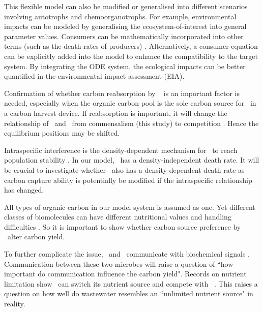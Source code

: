 \documentclass[../thesis.tex]{subfiles} %
\begin{document}
This flexible model can also be modified or generalised into different scenarios involving autotrophs and chemoorganotrophs.  For example, environmental impacts can be modeled by generalising the ecosystem-of-interest into general parameter values.  Consumers can be mathematically incorporated into other terms (such as the death rates of producers) \autocite{hurtt1996pelagic}.  Alternatively, a consumer equation can be explicitly added into the model to enhance the compatibility to the target system.  By integrating the ODE system, the ecological impacts can be better quantified in the environmental impact assessment (EIA).

Confirmation of whether carbon reabsorption by \phy\ \autocite{j1989respiration,bratbak1985phytoplankton,samejima1958heterotrophic} is an important factor is needed, especially when the organic carbon pool is the sole carbon source for \bac\ in a carbon harvest device.  If reabsorption is important, it will change the relationship of \phy\ and \bac\ from commensalism (this study) to competition \autocite{bratbak1985phytoplankton}.  Hence the equilibrium positions may be shifted.

Intraspecific interference is the density-dependent mechanism for \phy\ to reach population stability \autocite{o2017unexpected,savage2004effects,allen2007recasting,bernhardt2018metabolic}.  In our model, \bac\ has a density-independent death rate.  It will be crucial to investigate whether \bac\ also has a density-dependent death rate as carbon capture ability is potentially be modified if the intraspecific relationship has changed.

All types of organic carbon in our model system is assumed as one.  Yet different classes of biomolecules can have different nutritional values and handling difficulties \autocite{amon1996bacterial}.  So it is important to show whether carbon source preference by \bac\ alter carbon yield.

To further complicate the issue, \phy\ and \bac\ communicate with biochemical signals \autocite{beliaev2014inference,amin2012interactions}.  Communication between these two microbes will raise a question of ``how important do communication influence the carbon yield".  Records on nutrient limitation show \bac\ can switch its nutrient source and compete with \phy\ \autocite{danger2007bacteria}.  This raises a question on how well do wastewater resembles an ``unlimited nutrient source" in reality.
\end{document}
